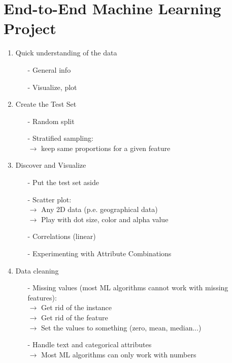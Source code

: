 \documentclass[french]{article}
\begin{document}
\section{End-to-End Machine Learning Project}

\begin{enumerate}

\item Quick understanding of the data
    \begin{itemize}
        \item[-] General info
        \item[-] Visualize, plot
    \end{itemize}
\item Create the Test Set
    \begin{itemize}
        \item[-] Random split
        \item[-] Stratified sampling: \\
             $\rightarrow$ keep same proportions for a given feature
    \end{itemize}
\item Discover and Visualize
    \begin{itemize}
        \item[-] Put the test set aside
        \item[-] Scatter plot: \\
             $\rightarrow$ Any 2D data (p.e. geographical data) \\
             $\rightarrow$ Play with dot size, color and alpha value
        \item[-] Correlations (linear)
        \item[-] Experimenting with Attribute Combinations
    \end{itemize}
\item Data cleaning
    \begin{itemize}
        \item[-] Missing values (most ML algorithms cannot work with missing features):\\
             $\rightarrow$ Get rid of the instance \\
             $\rightarrow$ Get rid of the feature \\
             $\rightarrow$ Set the values to something (zero, mean, median...)
        \item[-] Handle text and categorical attributes \\
             $\rightarrow$ Most ML algorithms can only work with numbers \\

\end{itemize}
\end{enumerate}
\end{document}
